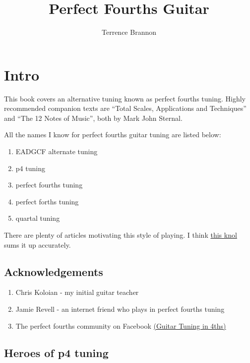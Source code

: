 \documentclass[12pt]{report}
\begin{document}
\title{Perfect Fourths Guitar}
\author{Terrence Brannon}
\maketitle


\tableofcontents

\chapter{Intro}

This book covers an alternative tuning known as perfect fourths
tuning. Highly recommended companion texts are ``Total Scales,
Applications and Techniques'' and ``The 12 Notes of Music'', both by
Mark John Sternal.

All the names I know for perfect fourths guitar tuning are listed
below: 

\begin{enumerate}
\item EADGCF alternate tuning
\item p4 tuning
\item perfect fourths tuning
\item perfect forths tuning
\item quartal tuning
\end{enumerate}

There are plenty of articles motivating this style of playing. I think
\href{http://knol.google.com/k/guitar-tuning-in-fourths#}{this knol}
sums it up accurately.

\section{Acknowledgements}

\begin{enumerate}
\item Chris Koloian - my initial guitar teacher
\item Jamie Revell - an internet friend who plays in perfect fourths
  tuning 
\item The perfect fourths community on Facebook
  \href{http://www.facebook.com/#!/group.php?gid=183968224067}{(Guitar
    Tuning in 4ths)}

\end{enumerate}

\section{Heroes of p4 tuning}
\end{document}
